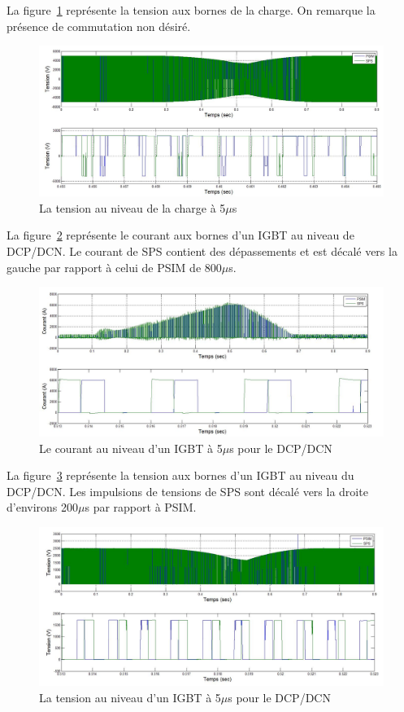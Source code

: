 \documentclass[11pt,letterpaper,final]{report}
\begin{document}
La figure~\ref{AF_DC_CHV5} représente la tension aux bornes de la charge. On remarque la présence de commutation non désiré.

\begin{figure}[htb]
\centering
\includegraphics[scale=0.5]{Fig/DCP_AFE/5u/ten_ch.jpg}
\caption{La tension au niveau de la charge à 5$\mu$s}
\label{AF_DC_CHV5}
\end{figure}

La figure~\ref{AF_DC_HAA5} représente le courant aux bornes d'un IGBT au niveau de DCP/DCN. Le courant de SPS contient des dépassements et est décalé vers la gauche par rapport à celui de PSIM de 800$\mu$s.

\begin{figure}[htb]
\centering
\includegraphics[scale=0.5]{Fig/DCP_AFE/5u/hash_cou_IGBT.jpg}
\caption{Le courant au niveau d'un IGBT à 5$\mu$s pour le DCP/DCN}
\label{AF_DC_HAA5}
\end{figure}

La figure~\ref{AF_DC_HAV5} représente la tension aux bornes d'un IGBT au niveau du DCP/DCN. Les impulsions de tensions de SPS sont décalé vers la droite d'environs 200$\mu$s par rapport à PSIM.

\begin{figure}[htb]
\centering
\includegraphics[scale=0.5]{Fig/DCP_AFE/5u/hash_ten_IGBT.jpg}
\caption{La tension au niveau d'un IGBT à 5$\mu$s pour le DCP/DCN}
\label{AF_DC_HAV5}
\end{figure}
\end{document}
